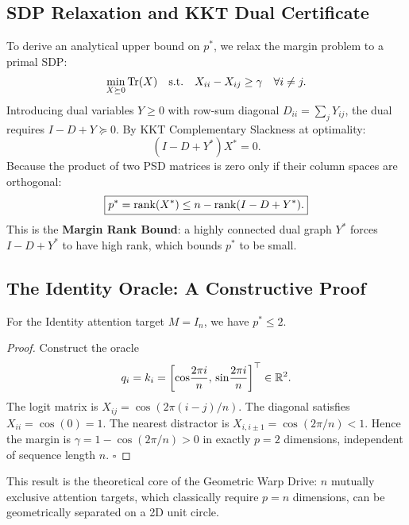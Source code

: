\subsection{SDP Relaxation and KKT Dual Certificate}
\label{sec:kkt}

To derive an analytical upper bound on $p^*$, we relax the margin problem to a primal SDP:
\begin{equation}
\begin{aligned}
  \min_{X \succeq 0} \operatorname{Tr}(X) \quad \text{s.t.} \quad X_{ii} - X_{ij} \geq \gamma \quad
  \forall i \neq j.
\end{aligned}
\end{equation}
Introducing dual variables $Y \geq 0$ with row-sum diagonal $D_{ii} = \sum_j Y_{ij}$, the
dual requires $I - D + Y \succeq 0$. By KKT Complementary Slackness at optimality:
\begin{equation}
  (I - D + Y^*)X^* = 0.
\end{equation}
Because the product of two PSD matrices is zero only if their column spaces are orthogonal:
\begin{equation}
  \boxed{p^* = \operatorname{rank}(X^*) \leq n - \operatorname{rank}(I - D + Y^*).}
  \label{eq:margin_rank_bound}
\end{equation}
This is the \textbf{Margin Rank Bound}: a highly connected dual graph $Y^*$ forces
$I - D + Y^*$ to have high rank, which bounds $p^*$ to be small.

\subsection{The Identity Oracle: A Constructive Proof}

\begin{proposition}
  For the Identity attention target $M = I_n$, we have $p^* \leq 2$.
\end{proposition}
\begin{proof}
  Construct the oracle
  \[
    q_i = k_i = \left[\cos\!\frac{2\pi i}{n},\, \sin\!\frac{2\pi i}{n}\right]^\top
    \in \mathbb{R}^2.
  \]
  The logit matrix is $X_{ij} = \cos(2\pi(i-j)/n)$. The diagonal satisfies
  $X_{ii} = \cos(0) = 1$. The nearest distractor is $X_{i,i\pm 1} = \cos(2\pi/n) < 1$.
  Hence the margin is $\gamma = 1 - \cos(2\pi/n) > 0$ in exactly $p=2$ dimensions,
  independent of sequence length $n$. $\square$
\end{proof}

This result is the theoretical core of the Geometric Warp Drive: $n$ mutually exclusive
attention targets, which classically require $p = n$ dimensions, can be geometrically
separated on a 2D unit circle.

